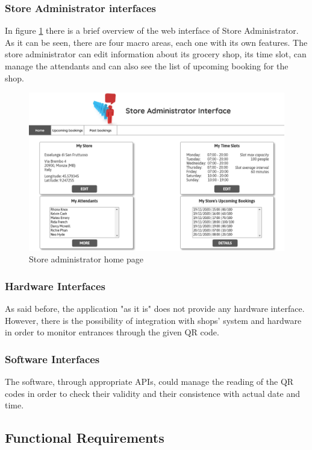 \documentclass[table, 12pt]{article}
\begin{document}
\subsubsection{Store Administrator interfaces}
In figure \ref{mock_store_admin_home} there is a brief overview of the web interface of Store Administrator.
As it can be seen, there are four macro areas, each one with its own features.
The store administrator can edit information about its grocery shop, its time slot, can manage the attendants and can also see the list of upcoming booking for the shop.
\begin{figure}[H]
    \includegraphics[width=\textwidth]{assets/Mockups/mock_home_store_admin.png}
    \caption{Store administrator home page}
    \label{mock_store_admin_home}
\end{figure}

\subsubsection{Hardware Interfaces}
As said before, the application "as it is" does not provide any hardware interface.
However, there is the possibility of integration with shops' system and hardware in order to monitor entrances through the given QR code.
\subsubsection{Software Interfaces}
The software, through appropriate APIs, could manage the reading of the QR codes in order to check their validity and their consistence with actual date and time.


\subsection{Functional Requirements}
\end{document}
